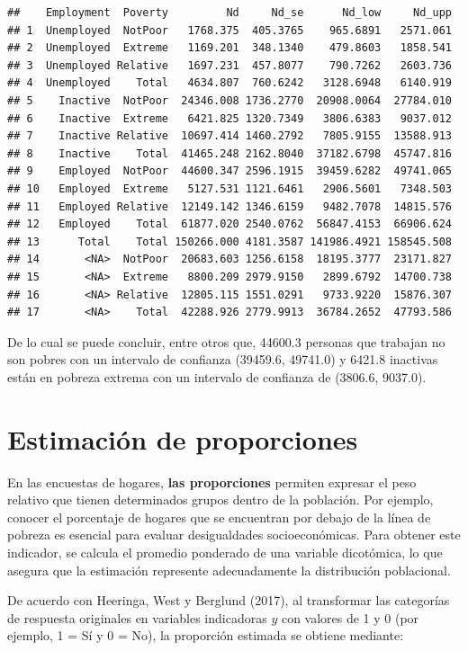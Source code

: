 \documentclass[
  12pt,
]{book}
\begin{document}
\begin{verbatim}
##    Employment  Poverty         Nd     Nd_se      Nd_low     Nd_upp
## 1  Unemployed  NotPoor   1768.375  405.3765    965.6891   2571.061
## 2  Unemployed  Extreme   1169.201  348.1340    479.8603   1858.541
## 3  Unemployed Relative   1697.231  457.8077    790.7262   2603.736
## 4  Unemployed    Total   4634.807  760.6242   3128.6948   6140.919
## 5    Inactive  NotPoor  24346.008 1736.2770  20908.0064  27784.010
## 6    Inactive  Extreme   6421.825 1320.7349   3806.6383   9037.012
## 7    Inactive Relative  10697.414 1460.2792   7805.9155  13588.913
## 8    Inactive    Total  41465.248 2162.8040  37182.6798  45747.816
## 9    Employed  NotPoor  44600.347 2596.1915  39459.6282  49741.065
## 10   Employed  Extreme   5127.531 1121.6461   2906.5601   7348.503
## 11   Employed Relative  12149.142 1346.6159   9482.7078  14815.576
## 12   Employed    Total  61877.020 2540.0762  56847.4153  66906.624
## 13      Total    Total 150266.000 4181.3587 141986.4921 158545.508
## 14       <NA>  NotPoor  20683.603 1256.6158  18195.3777  23171.827
## 15       <NA>  Extreme   8800.209 2979.9150   2899.6792  14700.738
## 16       <NA> Relative  12805.115 1551.0291   9733.9220  15876.307
## 17       <NA>    Total  42288.926 2779.9913  36784.2652  47793.586
\end{verbatim}

De lo cual se puede concluir, entre otros que, 44600.3 personas que trabajan no son pobres con un intervalo de confianza (39459.6, 49741.0) y 6421.8 inactivas están en pobreza extrema con un intervalo de confianza de (3806.6, 9037.0).

\section{Estimación de proporciones}\label{estimaciuxf3n-de-proporciones}

En las encuestas de hogares, \textbf{las proporciones} permiten expresar el peso relativo que tienen determinados grupos dentro de la población. Por ejemplo, conocer el porcentaje de hogares que se encuentran por debajo de la línea de pobreza es esencial para evaluar desigualdades socioeconómicas. Para obtener este indicador, se calcula el promedio ponderado de una variable dicotómica, lo que asegura que la estimación represente adecuadamente la distribución poblacional.

De acuerdo con Heeringa, West y Berglund (2017), al transformar las categorías de respuesta originales en variables indicadoras \(y\) con valores de 1 y 0 (por ejemplo, 1 = Sí y 0 = No), la proporción estimada se obtiene mediante:
\end{document}
